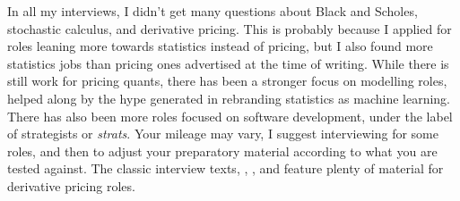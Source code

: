 \documentclass[11pt]{article}
\begin{document}
In all my interviews, I didn't get many questions about Black and Scholes, stochastic calculus, and derivative pricing.
This is probably because I applied for roles leaning more towards statistics instead of pricing, but I also found more statistics jobs than pricing ones advertised at the time of writing.
While there is still work for pricing quants, there has been a stronger focus on modelling roles, helped along by the hype generated in rebranding statistics as machine learning.
There has also been more roles focused on software development, under the label of strategists or \emph{strats}.
Your mileage may vary, I suggest interviewing for some roles, and then to adjust your preparatory material according to what you are tested against.
The classic interview texts,
\cite{HeardOnTheStreet},
\cite{WilmottFAQ}, and
\citet{JoshiQA}
feature plenty of material for derivative pricing roles.




\end{document}
